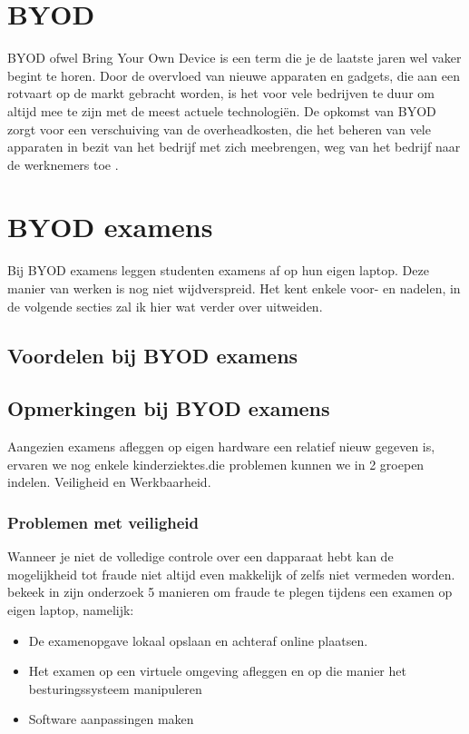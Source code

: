 \section{BYOD}

BYOD ofwel Bring Your Own Device is een term die je de laatste jaren wel vaker begint te horen. Door de overvloed van nieuwe apparaten en gadgets, die aan een rotvaart op de markt gebracht worden, is het voor vele bedrijven te duur om altijd mee te zijn met de meest actuele technologiën. De opkomst van BYOD zorgt voor een verschuiving van de overheadkosten, die het beheren van vele apparaten in bezit van het bedrijf met zich meebrengen, weg van het bedrijf naar de werknemers toe \autocite{Hong2016}.

\section{BYOD examens}
Bij BYOD examens leggen studenten examens af op hun eigen laptop. Deze manier van werken is nog niet wijdverspreid. Het kent enkele voor- en nadelen, in de volgende secties zal ik hier wat verder over uitweiden. 

\subsection{Voordelen bij BYOD examens}


\subsection{Opmerkingen bij BYOD examens}

Aangezien examens afleggen op eigen hardware een relatief nieuw gegeven is, ervaren we nog enkele kinderziektes.die problemen kunnen we in 2 groepen indelen. Veiligheid en Werkbaarheid.\\ 

\subsubsection{Problemen met veiligheid}
Wanneer je niet de volledige controle over een dapparaat hebt kan de mogelijkheid tot fraude niet altijd even makkelijk of zelfs niet vermeden worden.
\textcite{Dawson2016} bekeek in zijn onderzoek 5 manieren om fraude te plegen tijdens een examen op eigen laptop, namelijk: 
\begin{itemize}
	\item De examenopgave lokaal opslaan en achteraf online plaatsen.
	\item Het examen op een virtuele omgeving afleggen en op die manier het besturingssysteem manipuleren
	\item Software aanpassingen maken 

\end{itemize}

